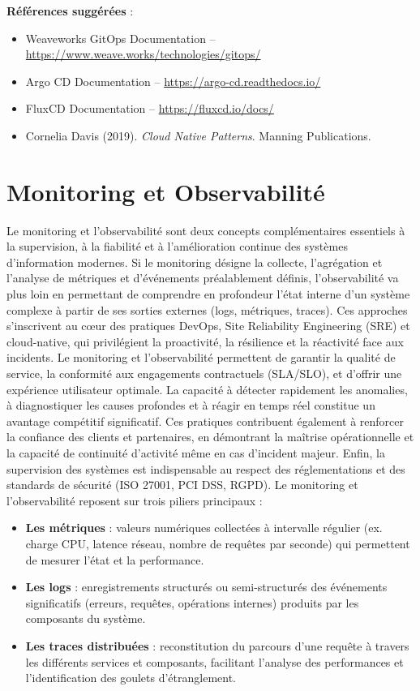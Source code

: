 \textbf{Références suggérées} :
\begin{itemize}
	\item Weaveworks GitOps Documentation – \url{https://www.weave.works/technologies/gitops/}
	\item Argo CD Documentation – \url{https://argo-cd.readthedocs.io/}
	\item FluxCD Documentation – \url{https://fluxcd.io/docs/}
	\item Cornelia Davis (2019). \textit{Cloud Native Patterns}. Manning Publications.
\end{itemize}

\section{Monitoring et Observabilité}

Le monitoring et l’observabilité sont deux concepts complémentaires essentiels à la supervision, à la fiabilité et à l’amélioration continue des systèmes d’information modernes. Si le monitoring désigne la collecte, l’agrégation et l’analyse de métriques et d’événements préalablement définis, l’observabilité va plus loin en permettant de comprendre en profondeur l’état interne d’un système complexe à partir de ses sorties externes (logs, métriques, traces). Ces approches s’inscrivent au cœur des pratiques DevOps, Site Reliability Engineering (SRE) et cloud-native, qui privilégient la proactivité, la résilience et la réactivité face aux incidents.
Le monitoring et l’observabilité permettent de garantir la qualité de service, la conformité aux engagements contractuels (SLA/SLO), et d’offrir une expérience utilisateur optimale. La capacité à détecter rapidement les anomalies, à diagnostiquer les causes profondes et à réagir en temps réel constitue un avantage compétitif significatif. Ces pratiques contribuent également à renforcer la confiance des clients et partenaires, en démontrant la maîtrise opérationnelle et la capacité de continuité d’activité même en cas d’incident majeur. Enfin, la supervision des systèmes est indispensable au respect des réglementations et des standards de sécurité (ISO 27001, PCI DSS, RGPD).
Le monitoring et l’observabilité reposent sur trois piliers principaux :
\begin{itemize}
	\item \textbf{Les métriques} : valeurs numériques collectées à intervalle régulier (ex. charge CPU, latence réseau, nombre de requêtes par seconde) qui permettent de mesurer l’état et la performance.
	\item \textbf{Les logs} : enregistrements structurés ou semi-structurés des événements significatifs (erreurs, requêtes, opérations internes) produits par les composants du système.
	\item \textbf{Les traces distribuées} : reconstitution du parcours d’une requête à travers les différents services et composants, facilitant l’analyse des performances et l’identification des goulets d’étranglement.
\end{itemize}


